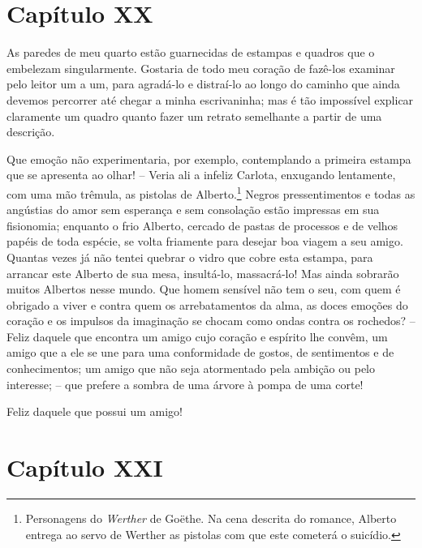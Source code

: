 \section{Capítulo XX}

 As paredes de meu quarto estão guarnecidas de estampas e quadros que o
embelezam singularmente. Gostaria de todo meu coração de fazê-los
examinar pelo leitor um a um, para agradá-lo e distraí-lo ao longo do
caminho que ainda devemos percorrer até chegar a minha escrivaninha;
mas é tão impossível explicar claramente um quadro quanto fazer um
retrato semelhante a partir de uma descrição.

 Que emoção não experimentaria, por exemplo, contemplando a primeira
estampa que se apresenta ao olhar! -- Veria ali a infeliz Carlota,
enxugando lentamente, com uma mão trêmula, as pistolas de
Alberto.\footnote{ Personagens do \textit{Werther} de Goëthe. Na cena
descrita do romance, Alberto entrega ao servo de Werther as pistolas
com que este cometerá o suicídio.} Negros pressentimentos e todas
as angústias do amor sem esperança e sem consolação estão impressas em
sua fisionomia; enquanto o frio Alberto, cercado de pastas de processos
e de velhos papéis de toda espécie, se volta friamente para desejar boa
viagem a seu amigo. Quantas vezes já não tentei quebrar o vidro que
cobre esta estampa, para arrancar este Alberto de sua mesa, insultá-lo,
massacrá-lo! Mas ainda sobrarão muitos Albertos nesse mundo. Que homem
sensível não tem o seu, com quem é obrigado a viver e contra quem os
arrebatamentos da alma, as doces emoções do coração e os impulsos da
imaginação se chocam como ondas contra os rochedos? -- Feliz daquele
que encontra um amigo cujo coração e espírito lhe convêm, um amigo que
a ele se une para uma conformidade de gostos, de sentimentos e de
conhecimentos; um amigo que não seja atormentado pela ambição ou pelo
interesse; -- que prefere a sombra de uma árvore à pompa de uma corte!

 Feliz daquele que possui um amigo!

\section{Capítulo XXI}

